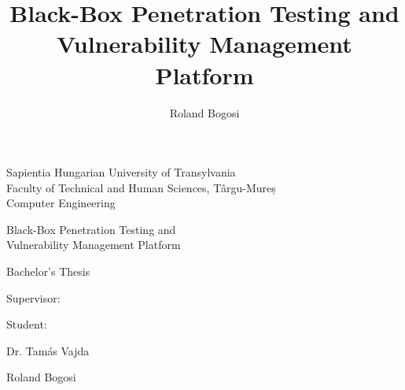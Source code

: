 \documentclass[a4paper,12pt]{article}
\author{Roland Bogosi}
\title{Black-Box Penetration Testing and Vulnerability Management Platform}
\begin{document}
%
%

\begingroup
	
\endgroup

\clearcontents

%
%

\begingroup
	
\endgroup

\clearcontents

%
%

\newpage
\pagestyle{empty}

	\begin{center}
		{\Large Sapientia Hungarian University of Transylvania}\\\vspace{0.07in}
		{\Large Faculty of Technical and Human Sciences, Târgu-Mureș}\\\vspace{0.07in}
		{\Large Computer Engineering}\\
		
		\vspace{2.35in}
		
		{\huge Black-Box Penetration Testing and}\\\vspace{0.15in}
		{\huge Vulnerability Management Platform}
		
		\vspace{0.5in}
		
		{\LARGE Bachelor's Thesis}
		
	\end{center}
	
	\vspace{2.0in}
	
	\begin{multicols}{2}
		\begin{flushleft}
			{\Large Supervisor:}
		\end{flushleft}
		\columnbreak
		\begin{flushright}
			{\Large Student:}
		\end{flushright}
	\end{multicols}
	\begin{multicols}{2}
		\begin{flushleft}
			{\LARGE Dr. Tamás Vajda}
		\end{flushleft}
		\columnbreak
		\begin{flushright}
			{\LARGE Roland Bogosi}
		\end{flushright}
	\end{multicols}
	
\end{document}
